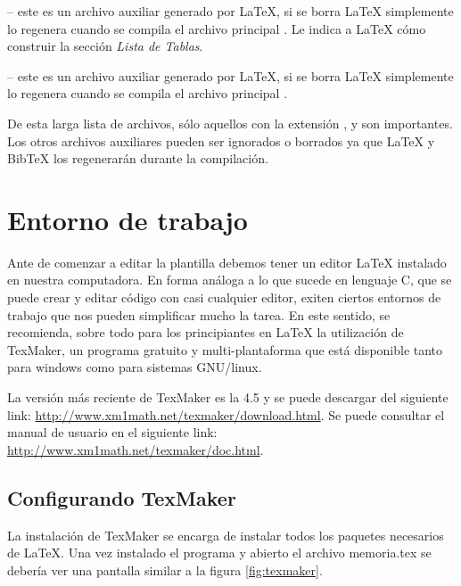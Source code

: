  -- este es un archivo auxiliar generado por \LaTeX{}, si se borra \LaTeX{} simplemente lo regenera cuando se compila el archivo principal .  Le indica a \LaTeX{} cómo construir la sección \emph{Lista de Tablas}.

 -- este es un archivo auxiliar generado por \LaTeX{}, si se borra \LaTeX{} simplemente lo regenera cuando se compila el archivo principal .

De esta larga lista de archivos, sólo aquellos con la extensión ,  y  son importantes.  Los otros archivos auxiliares pueden ser ignorados o borrados ya que \LaTeX{} y BibTeX los regenerarán durante la compilación.


\section{Entorno de trabajo}

Ante de comenzar a editar la plantilla debemos tener un editor \LaTeX{} instalado en nuestra computadora.  En forma análoga a lo que sucede en lenguaje C, que se puede crear y editar código con casi cualquier editor, exiten ciertos entornos de trabajo que nos pueden simplificar mucho la tarea.  En este sentido, se recomienda, sobre todo para los principiantes en \LaTeX{} la utilización de TexMaker, un programa gratuito y multi-plantaforma que está disponible tanto para windows como para sistemas GNU/linux.

La versión más reciente de TexMaker es la 4.5 y se puede descargar del siguiente link: \url{http://www.xm1math.net/texmaker/download.html}. Se puede consultar el manual de usuario en el siguiente link: \url{http://www.xm1math.net/texmaker/doc.html}.

\subsection{Configurando TexMaker}

La instalación de TexMaker se encarga de instalar todos los paquetes necesarios de \LaTeX{}. 
Una vez instalado el programa y abierto el archivo memoria.tex se debería ver una pantalla similar a la figura \ref{fig:texmaker}. 


